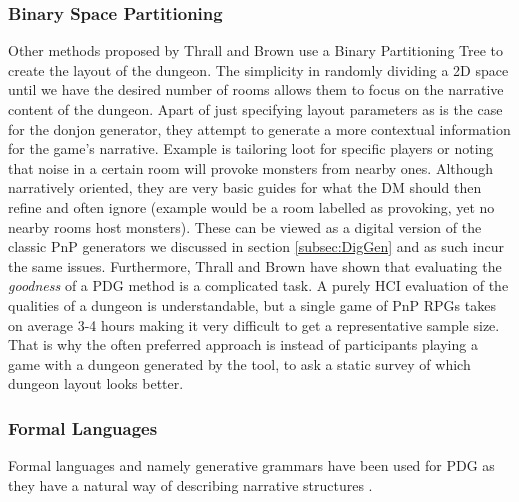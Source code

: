 \documentclass{UoYCSproject}
\begin{document}
\subsubsection{Binary Space Partitioning}
Other methods proposed by Thrall \parencite{Thrall} and Brown \parencite{Brown} use a Binary Partitioning Tree \parencite{BSP} to create the layout of the dungeon. The simplicity in randomly dividing a 2D space until we have the desired number of rooms allows them to focus on the narrative content of the dungeon. Apart of just specifying layout parameters as is the case for the donjon generator, they attempt to generate a more contextual information for the game's narrative. Example is tailoring loot for specific players or noting that noise in a certain room will provoke monsters from nearby ones. Although narratively oriented, they are very basic guides for what the DM should then refine and often ignore (example would be a room labelled as provoking, yet no nearby rooms host monsters). These can be viewed as a digital version of the classic PnP generators we discussed in section \ref{subsec:DigGen} and as such incur the same issues. Furthermore, Thrall and Brown have shown that evaluating the \textit{goodness} of a PDG method is a complicated task. A purely HCI evaluation of the qualities of a dungeon is understandable, but a single game of PnP RPGs takes on average 3-4 hours \parencite{gameSessionLengthPoll} making it very difficult to get a representative sample size. That is why the often preferred approach is instead of participants playing a game with a dungeon generated by the tool, to ask a static survey of which dungeon layout looks better. %

\subsubsection{Formal Languages}
Formal languages and namely generative grammars have been used for PDG as they have a natural way of describing narrative structures \parencite{DormansMS,Cadogan,Deery}. 
\end{document}
